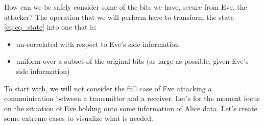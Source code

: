 How can we be safely consider some of the bits we have, secure from Eve, the attacker? The operation that we will perform have to transform the state \ref{eq:cq_state} into one that is:

\begin{itemize}
\item un-correlated with respect to  Eve's side information \\
\item uniform over a subset of the original bits (as large as possible, given Eve's side information)
\end{itemize}

To start with, we will not consider the full case of Eve attacking a commuinication between a transmitter and a receiver. Let's for the moment focus on the situation of Eve holding onto some information of Alice data.
Let's create some extreme cases to visualize what is needed.

